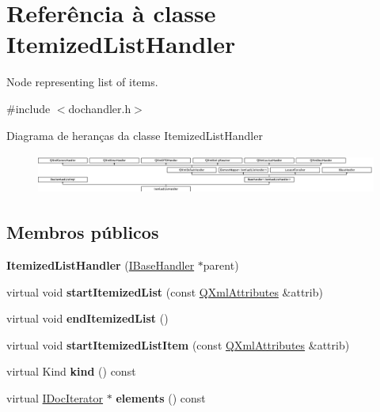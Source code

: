 \hypertarget{class_itemized_list_handler}{\section{Referência à classe Itemized\-List\-Handler}
\label{class_itemized_list_handler}
}


Node representing list of items.  




{\ttfamily \#include $<$dochandler.\-h$>$}

Diagrama de heranças da classe Itemized\-List\-Handler\begin{figure}[H]
\begin{center}
\leavevmode
\includegraphics[height=1.327801cm]{class_itemized_list_handler}
\end{center}
\end{figure}
\subsection*{Membros públicos}
\begin{DoxyCompactItemize}
\item 
\hypertarget{class_itemized_list_handler_afda33c8ab1f6395f1cb5e718b301a52b}{{\bfseries Itemized\-List\-Handler} (\hyperlink{class_i_base_handler}{I\-Base\-Handler} $\ast$parent)}\label{class_itemized_list_handler_afda33c8ab1f6395f1cb5e718b301a52b}

\item 
\hypertarget{class_itemized_list_handler_a6e3b6970626df600d93059a32587663f}{virtual void {\bfseries start\-Itemized\-List} (const \hyperlink{class_q_xml_attributes}{Q\-Xml\-Attributes} \&attrib)}\label{class_itemized_list_handler_a6e3b6970626df600d93059a32587663f}

\item 
\hypertarget{class_itemized_list_handler_a1a39ff5c2da04231321391b5fa27f4d0}{virtual void {\bfseries end\-Itemized\-List} ()}\label{class_itemized_list_handler_a1a39ff5c2da04231321391b5fa27f4d0}

\item 
\hypertarget{class_itemized_list_handler_a2e22616a37d1757cd6a2a0aadffd27ac}{virtual void {\bfseries start\-Itemized\-List\-Item} (const \hyperlink{class_q_xml_attributes}{Q\-Xml\-Attributes} \&attrib)}\label{class_itemized_list_handler_a2e22616a37d1757cd6a2a0aadffd27ac}

\item 
\hypertarget{class_itemized_list_handler_af8e62c8a81ddf2283205cc8955de50eb}{virtual Kind {\bfseries kind} () const }\label{class_itemized_list_handler_af8e62c8a81ddf2283205cc8955de50eb}

\item 
\hypertarget{class_itemized_list_handler_a3852144fad03681468c2c73e84c29c30}{virtual \hyperlink{class_i_doc_iterator}{I\-Doc\-Iterator} $\ast$ {\bfseries elements} () const }\label{class_itemized_list_handler_a3852144fad03681468c2c73e84c29c30}

\end{DoxyCompactItemize}
